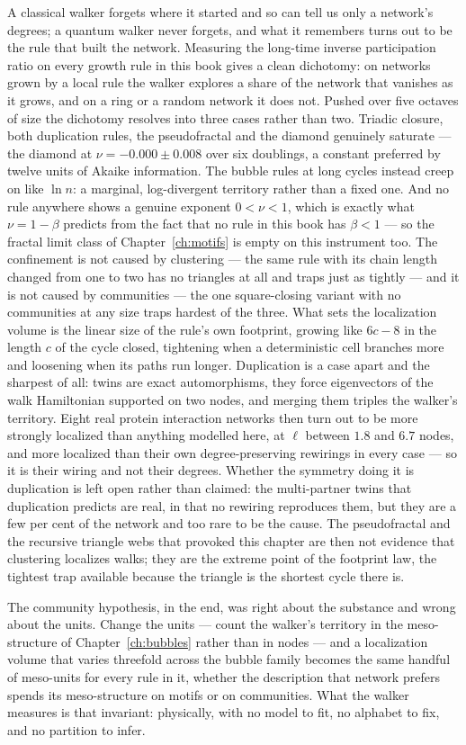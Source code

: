 A classical walker forgets where it started and so can tell us only a network's
degrees; a quantum walker never forgets, and what it remembers turns out to be the
rule that built the network. Measuring the long-time inverse participation ratio on
every growth rule in this book gives a clean dichotomy: on networks grown by a local
rule the walker explores a share of the network that vanishes as it grows, and on a
ring or a random network it does not. Pushed over five octaves of size the dichotomy
resolves into three cases rather than two. Triadic closure, both duplication rules,
the pseudofractal and the diamond genuinely saturate --- the diamond at
$\nu=-0.000\pm0.008$ over six doublings, a constant preferred by twelve units of
Akaike information. The bubble rules at long cycles instead creep on like $\ln n$: a
marginal, log-divergent territory rather than a fixed one. And no rule anywhere shows
a genuine exponent $0<\nu<1$, which is exactly what $\nu=1-\beta$ predicts from the
fact that no rule in this book has $\beta<1$ --- so the fractal limit class of
Chapter~\ref{ch:motifs} is empty on this instrument too. The confinement is not caused by
clustering --- the same rule with its chain length changed from one to two has no
triangles at all and traps just as tightly --- and it is not caused by communities
--- the one square-closing variant with no communities at any size traps hardest of
the three. What sets the localization volume is the linear size of the rule's own
footprint, growing like $6c-8$ in the length $c$ of the cycle closed, tightening
when a deterministic cell branches more and loosening when its paths run longer.
Duplication is a case apart and the sharpest of all: twins are exact automorphisms,
they force eigenvectors of the walk Hamiltonian supported on two nodes, and merging
them triples the walker's territory. Eight real protein interaction networks then turn
out to be more strongly localized than anything modelled here, at $\ell$ between $1.8$
and $6.7$ nodes, and more localized than their own degree-preserving rewirings in every
case --- so it is their wiring and not their degrees. Whether the symmetry doing it is
duplication is left open rather than claimed: the multi-partner twins that duplication
predicts are real, in that no rewiring reproduces them, but they are a few per cent of
the network and too rare to be the cause. The pseudofractal and the recursive triangle
webs that provoked this chapter are then not evidence that clustering localizes
walks; they are the extreme point of the footprint law, the tightest trap available
because the triangle is the shortest cycle there is.

The community hypothesis, in the end, was right about the substance and wrong about
the units. Change the units --- count the walker's territory in the meso-structure of
Chapter~\ref{ch:bubbles} rather than in nodes --- and a localization volume that
varies threefold across the bubble family becomes the same handful of meso-units for
every rule in it, whether the description that network prefers spends its
meso-structure on motifs or on communities. What the walker measures is that
invariant: physically, with no model to fit, no alphabet to fix, and no partition to
infer.
